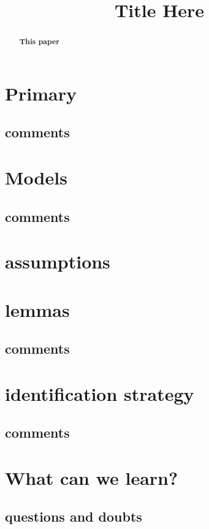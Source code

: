 \documentclass[12pt,sts,intlimits]{imsart-mod}
\begin{document}
\begin{frontmatter}

	\title{Title Here}
	\runtitle{}

    \author{\fnms{}
        \snm{} \ead[label=tong]{}
    }
    \affiliation{}

\begin{abstract}
  \textbf{This paper}
\end{abstract}


  \end{frontmatter}
  \section{Primary}


    \subsection{comments}

    \section{Models}

    \subsection{comments}

    \section{assumptions}

    \section{lemmas}

 \subsection{comments}

 \section{identification strategy}
  
    \subsection{comments}

    \section{What can we learn? }

    \subsection{questions and doubts}

  
\end{document}
